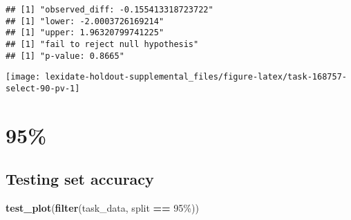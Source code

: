 \documentclass[
]{book}
\newenvironment{Shaded}{\begin{snugshade}}{\end{snugshade}}
\newcommand{\AttributeTok}[1]{\textcolor[rgb]{0.13,0.29,0.53}{#1}}
\newcommand{\DecValTok}[1]{\textcolor[rgb]{0.00,0.00,0.81}{#1}}
\newcommand{\FunctionTok}[1]{\textcolor[rgb]{0.13,0.29,0.53}{\textbf{#1}}}
\newcommand{\NormalTok}[1]{#1}
\newcommand{\OtherTok}[1]{\textcolor[rgb]{0.56,0.35,0.01}{#1}}
\newcommand{\SpecialCharTok}[1]{\textcolor[rgb]{0.81,0.36,0.00}{\textbf{#1}}}
\newcommand{\StringTok}[1]{\textcolor[rgb]{0.31,0.60,0.02}{#1}}
\begin{document}
\begin{Shaded}
\end{Shaded}

\begin{verbatim}
## [1] "observed_diff: -0.155413318723722"
## [1] "lower: -2.0003726169214"
## [1] "upper: 1.96320799741225"
## [1] "fail to reject null hypothesis"
## [1] "p-value: 0.8665"
\end{verbatim}

\texttt{[image: lexidate-holdout-supplemental\_files/figure-latex/task-168757-select-90-pv-1]}

\hypertarget{section-24}{%
\section{95\%}\label{section-24}}

\hypertarget{testing-set-accuracy-24}{%
\subsection{Testing set accuracy}\label{testing-set-accuracy-24}}

\begin{Shaded}
\begin{Highlighting}[]
\FunctionTok{test\_plot}\NormalTok{(}\FunctionTok{filter}\NormalTok{(task\_data, split }\SpecialCharTok{==} \StringTok{\textquotesingle{}95\%\textquotesingle{}}\NormalTok{))}
\end{Highlighting}
\end{Shaded}
\end{document}
